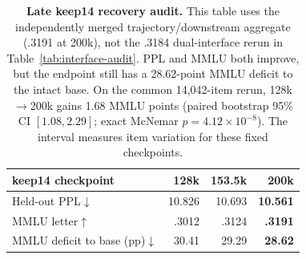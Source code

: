 \begin{table}[t]
\centering
\scriptsize
\setlength{\tabcolsep}{3.0pt}
\begin{tabular}{@{}lrrr@{}}
\toprule
\textbf{keep14 checkpoint} & \textbf{128k} & \textbf{153.5k} & \textbf{200k} \\
\midrule
Held-out PPL$\downarrow$ & 10.826 & 10.693 & \textbf{10.561} \\
MMLU letter$\uparrow$ & .3012 & .3124 & \textbf{.3191} \\
MMLU deficit to base (pp)$\downarrow$ & 30.41 & 29.29 & \textbf{28.62} \\
\bottomrule
\end{tabular}
\caption{\textbf{Late keep14 recovery audit.} This table uses the independently
merged trajectory/downstream aggregate (.3191 at 200k), not the .3184
dual-interface rerun in Table~\ref{tab:interface-audit}. PPL and MMLU both improve, but
the endpoint still has a 28.62-point MMLU deficit to the intact base. On the
common 14,042-item rerun, 128k$\rightarrow$200k gains 1.68 MMLU points
(paired bootstrap 95\% CI $[1.08,2.29]$; exact McNemar
$p=4.12{\times}10^{-8}$). The interval measures item variation for these fixed
checkpoints.}
\label{tab:trajectory-audit}
\end{table}
